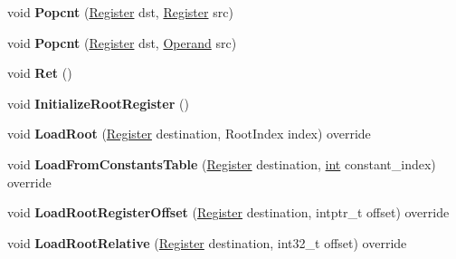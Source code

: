 \begin{DoxyCompactItemize}
void {\bfseries Popcnt} (\mbox{\hyperlink{classv8_1_1internal_1_1Register}{Register}} dst, \mbox{\hyperlink{classv8_1_1internal_1_1Register}{Register}} src)
\item 
\mbox{\label{classv8_1_1internal_1_1TurboAssembler_a65325ee936e2388e3b6930a66c54fe97}} 
void {\bfseries Popcnt} (\mbox{\hyperlink{classv8_1_1internal_1_1Register}{Register}} dst, \mbox{\hyperlink{classv8_1_1internal_1_1Operand}{Operand}} src)
\item 
\mbox{\label{classv8_1_1internal_1_1TurboAssembler_aef6d2d20b513c5155a12a3973e0e46d6}} 
void {\bfseries Ret} ()
\item 
\mbox{\label{classv8_1_1internal_1_1TurboAssembler_a919c742613dc1bcf65b76c2c8dddde57}} 
void {\bfseries Initialize\+Root\+Register} ()
\item 
\mbox{\label{classv8_1_1internal_1_1TurboAssembler_a931af7443ae4f741ae52403554cca319}} 
void {\bfseries Load\+Root} (\mbox{\hyperlink{classv8_1_1internal_1_1Register}{Register}} destination, Root\+Index index) override
\item 
\mbox{\label{classv8_1_1internal_1_1TurboAssembler_a6c8fae865ac1fd7f79f9d4934a46392a}} 
void {\bfseries Load\+From\+Constants\+Table} (\mbox{\hyperlink{classv8_1_1internal_1_1Register}{Register}} destination, \mbox{\hyperlink{classint}{int}} constant\+\_\+index) override
\item 
\mbox{\label{classv8_1_1internal_1_1TurboAssembler_a20588856c39f30350ccd570332e761ea}} 
void {\bfseries Load\+Root\+Register\+Offset} (\mbox{\hyperlink{classv8_1_1internal_1_1Register}{Register}} destination, intptr\+\_\+t offset) override
\item 
\mbox{\label{classv8_1_1internal_1_1TurboAssembler_a77e9d10255bc9a25985ff71df883e665}} 
void {\bfseries Load\+Root\+Relative} (\mbox{\hyperlink{classv8_1_1internal_1_1Register}{Register}} destination, int32\+\_\+t offset) override
\item 
\mbox{\label{classv8_1_1internal_1_1TurboAssembler_a1feed56062c70c20aa013eb0a657c7cb}} 

\end{DoxyCompactItemize}
